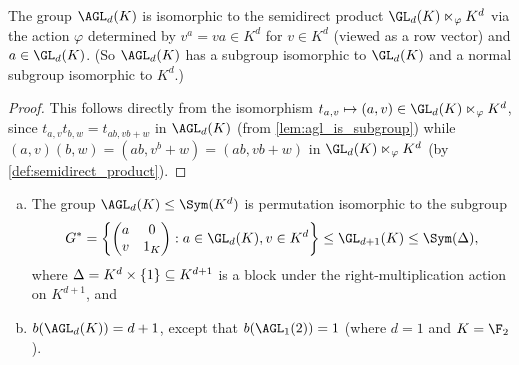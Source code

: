 \begin{proposition}\label{prop:agl_is_semidirect_product}
    The group $\AGL_d(K)$ is isomorphic to the semidirect product $\GL_d(K) \ltimes_\varphi K^d$ via the action $\varphi$ determined by $v^a = va \in K^d$ for $v \in K^d$ (viewed as a row vector) and $a \in \GL_d(K)$. (So $\AGL_d(K)$ has a subgroup isomorphic to $\GL_d(K)$ and a normal subgroup isomorphic to $K^d$.)
\end{proposition}

\begin{proof}
    This follows directly from the isomorphism $t_{a,v} \mapsto (a,v) \in \GL_d(K) \ltimes_\varphi K^d$, since $t_{a,v} t_{b,w} = t_{ab,vb+w}$ in $\AGL_d(K)$ (from \autoref{lem:agl_is_subgroup}) while $(a,v)(b,w) = (ab,v^b+w) = (ab,vb + w)$ in $\GL_d(K) \ltimes_\varphi K^d$ (by \autoref{def:semidirect_product}).
\end{proof}

\begin{proposition}\label{prop:agl_as_subgrp_of_gl}
    \begin{enumerate}[(a)]
        \item The group $\AGL_d(K) \leq \Sym(K^d)$ is permutation isomorphic to the subgroup
              $$G^* = \left\{
                  \begin{pmatrix}
                      a & 0   \\
                      v & 1_K
                  \end{pmatrix} : a \in \GL_d(K),v \in K^d\right\} \leq \GL_{d+1}(K) \leq \Sym(\Delta),$$
              where $\Delta = K^d \times \added{3}{\{1\}} \subseteq K^{d+1}$ is a block under the right-multiplication action  on $K^{d+1}$, and
        \item $b(\AGL_d(K)) = d + 1$, except that $b(\AGL_1(2)) = 1$ (where $d = 1$ and $K = \F_2$).
    \end{enumerate}
\end{proposition}

